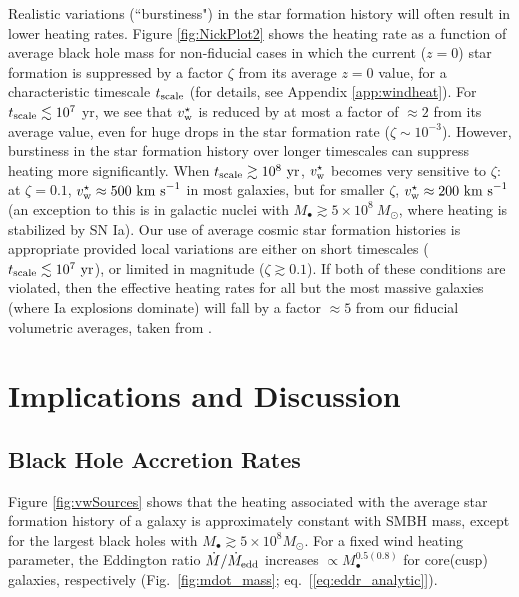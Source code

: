 \documentclass[usenatbib,fleqn]{mn2e}
\begin{document}
Realistic variations (``burstiness") in the star formation history
will often result in lower heating rates.  Figure \ref{fig:NickPlot2}
shows the heating rate as a function of average black hole mass for
non-fiducial cases in which the current ($z = 0$) star formation is
suppressed by a factor $\zeta$ from its average $z = 0$ value, for a
characteristic timescale $t_{\rm scale}$ (for details, see Appendix
\ref{app:windheat}).  For $t_{\rm scale} \lesssim 10^{7}$ yr, we see
that $v_{\rm w}^{\star}$ is reduced by at most a factor of $\approx 2$
from its average value, even for huge drops in the star formation rate
($\zeta \sim 10^{-3}$).  However, burstiness in the star formation
history over longer timescales can suppress heating more
significantly.  When $t_{\rm scale} \gtrsim 10^8~{\rm yr}$, $v_{\rm
  w}^\star$ becomes very sensitive to $\zeta$: at $\zeta=0.1$, $v_{\rm
  w}^\star \approx 500~{\rm km~s}^{-1}$ in most galaxies, but for
smaller $\zeta$, $v_{\rm w}^\star \approx 200~{\rm km~s}^{-1}$ (an
exception to this is in galactic nuclei with $M_\bullet \gtrsim
5\times 10^8~M_\odot$, where heating is stabilized by SN Ia).  Our use
of average cosmic star formation histories is appropriate provided
local variations are either on short timescales ($t_{\rm scale}
\lesssim 10^7~{\rm yr}$), or limited in magnitude ($\zeta \gtrsim
0.1$).  If both of these conditions are violated, then the effective
heating rates for all but the most massive galaxies (where Ia
explosions dominate) will fall by a factor $\approx 5$ from our
fiducial volumetric averages, taken from \citet{MosterNaab+:2013a}.


\section{Implications and Discussion}
\label{sec:discussion}

\subsection{Black Hole Accretion Rates}
\label{sec:mdot}

Figure \ref{fig:vwSources} shows that the heating associated with the
average star formation history of a galaxy is approximately constant
with SMBH mass, except for the largest black holes with $M_{\bullet}
\gtrsim 5\times 10^{8}M_{\odot}$.  For a fixed wind heating parameter,
the Eddington ratio $\dot{M}/\dot{M}_{\rm edd}$ increases $\propto
M_{\bullet}^{0.5(0.8)}$ for core(cusp) galaxies, respectively
(Fig.~\ref{fig:mdot_mass}; eq.~[\ref{eq:eddr_analytic}]).
\end{document}
